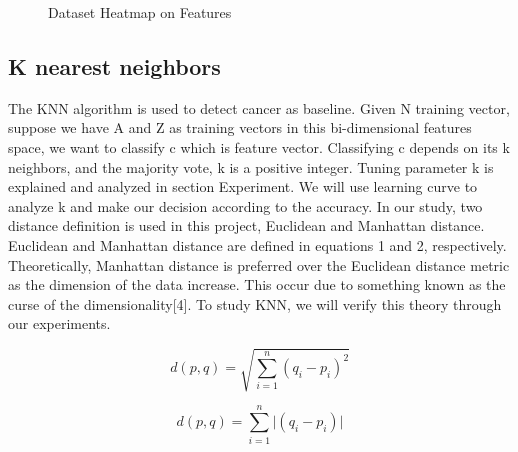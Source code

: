 \documentclass{article} %
\begin{document}
\begin{figure}[H]
\begin{center}
\caption{Dataset Heatmap on Features}
\end{center}
\end{figure}

\subsection{K nearest neighbors}
The KNN algorithm is used to detect cancer as baseline. Given N training vector, suppose we
have A and Z as training vectors in this bi-dimensional features space, we want to classify c which is feature vector. Classifying c depends on its k neighbors, and the majority vote, k is a positive integer. Tuning parameter k is explained and analyzed in section Experiment. We will use learning curve to analyze k and make our decision according to the accuracy. In our study, two distance definition is used in this project, Euclidean and Manhattan distance. Euclidean and Manhattan distance are defined in equations 1 and 2, respectively. Theoretically, Manhattan distance is preferred over the Euclidean distance metric as the dimension of the data increase. This occur due to something known as the curse of the dimensionality[4]. To study KNN, we will verify this theory through our experiments.

\begin{equation}
 d\left(p,q\right) = \sqrt {\sum _{i=1}^{n}  \left( q_{i} - p_{i}\right)^2 } 
\end{equation}


\begin{equation}
 d\left(p,q\right) = \sum _{i=1}^{n} \lvert \left( q_{i} - p_{i}\right) \rvert
\end{equation}
\end{document}
